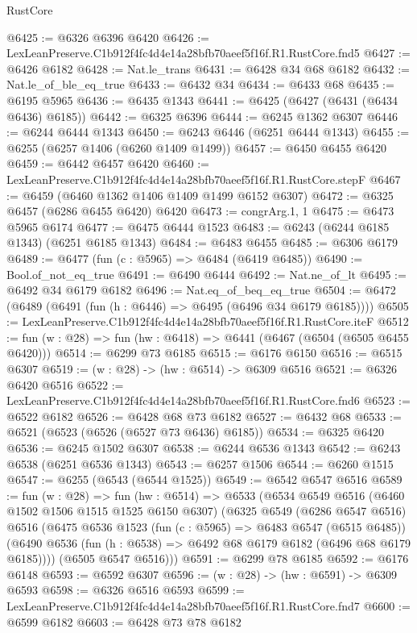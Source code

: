 \begin{lexlean}{RustCore}
\begin{coremodule}
@6425 := @6326 @6396 @6420
@6426 := LexLeanPreserve.C1b912f4fc4d4e14a28bfb70aeef5f16f.R1.RustCore.fnd5
@6427 := @6426 @6182
@6428 := Nat.le_trans
@6431 := @6428 @34 @68 @6182
@6432 := Nat.le_of_ble_eq_true
@6433 := @6432 @34
@6434 := @6433 @68
@6435 := @6195 @5965
@6436 := @6435 @1343
@6441 := @6425 (@6427 (@6431 (@6434 @6436) @6185))
@6442 := @6325 @6396
@6444 := @6245 @1362 @6307
@6446 := @6244 @6444 @1343
@6450 := @6243 @6446 (@6251 @6444 @1343)
@6455 := @6255 (@6257 @1406 (@6260 @1409 @1499))
@6457 := @6450 @6455 @6420
@6459 := @6442 @6457 @6420
@6460 := LexLeanPreserve.C1b912f4fc4d4e14a28bfb70aeef5f16f.R1.RustCore.stepF
@6467 := @6459 (@6460 @1362 @1406 @1409 @1499 @6152 @6307)
@6472 := @6325 @6457 (@6286 @6455 @6420) @6420
@6473 := congrArg.{1, 1}
@6475 := @6473 @5965 @6174
@6477 := @6475 @6444 @1523
@6483 := @6243 (@6244 @6185 @1343) (@6251 @6185 @1343)
@6484 := @6483 @6455
@6485 := @6306 @6179
@6489 := @6477 (fun (c : @5965) => @6484 (@6419 @6485))
@6490 := Bool.of_not_eq_true
@6491 := @6490 @6444
@6492 := Nat.ne_of_lt
@6495 := @6492 @34 @6179 @6182
@6496 := Nat.eq_of_beq_eq_true
@6504 := @6472 (@6489 (@6491 (fun (h : @6446) => @6495 (@6496 @34 @6179 @6185))))
@6505 := LexLeanPreserve.C1b912f4fc4d4e14a28bfb70aeef5f16f.R1.RustCore.iteF
@6512 := fun (w : @28) => fun (hw : @6418) => @6441 (@6467 (@6504 (@6505 @6455 @6420)))
@6514 := @6299 @73 @6185
@6515 := @6176 @6150
@6516 := @6515 @6307
@6519 := (w : @28) -> (hw : @6514) -> @6309 @6516
@6521 := @6326 @6420 @6516
@6522 := LexLeanPreserve.C1b912f4fc4d4e14a28bfb70aeef5f16f.R1.RustCore.fnd6
@6523 := @6522 @6182
@6526 := @6428 @68 @73 @6182
@6527 := @6432 @68
@6533 := @6521 (@6523 (@6526 (@6527 @73 @6436) @6185))
@6534 := @6325 @6420
@6536 := @6245 @1502 @6307
@6538 := @6244 @6536 @1343
@6542 := @6243 @6538 (@6251 @6536 @1343)
@6543 := @6257 @1506
@6544 := @6260 @1515
@6547 := @6255 (@6543 (@6544 @1525))
@6549 := @6542 @6547 @6516
@6589 := fun (w : @28) =>
  fun (hw : @6514) =>
  @6533
    (@6534
      @6549
      @6516
      (@6460 @1502 @1506 @1515 @1525 @6150 @6307)
      (@6325
        @6549
        (@6286 @6547 @6516)
        @6516
        (@6475
          @6536
          @1523
          (fun (c : @5965) => @6483 @6547 (@6515 @6485))
          (@6490 @6536 (fun (h : @6538) => @6492 @68 @6179 @6182 (@6496 @68 @6179 @6185))))
        (@6505 @6547 @6516)))
@6591 := @6299 @78 @6185
@6592 := @6176 @6148
@6593 := @6592 @6307
@6596 := (w : @28) -> (hw : @6591) -> @6309 @6593
@6598 := @6326 @6516 @6593
@6599 := LexLeanPreserve.C1b912f4fc4d4e14a28bfb70aeef5f16f.R1.RustCore.fnd7
@6600 := @6599 @6182
@6603 := @6428 @73 @78 @6182

\end{coremodule}
\end{lexlean}
